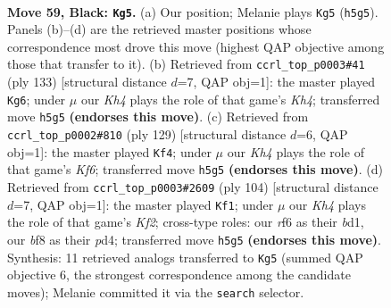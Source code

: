 \documentclass[11pt]{article}
\begin{document}
\clearpage

\begin{figure}[p]\centering
\begin{subfigure}{0.46\textwidth}\centering
\resizebox{\linewidth}{!}{%
\newchessgame
\chessboard[
  setfen={5B2/P7/5R2/1P5k/3K4/8/8/8 b - - 0 59},
  showmover=false,
  pgfstyle=straightmove, color=movearrow, markmove={h5-g5}
]}
\caption{}
\end{subfigure}\hfill
\begin{subfigure}{0.46\textwidth}\centering
\resizebox{\linewidth}{!}{%
\newchessgame
\chessboard[
  setfen={8/8/P7/5n1k/8/1P6/K2B4/3R4 b - - 2 67},
  showmover=false,
  pgfstyle=straightmove, color=movearrow, markmove={h5-g6}
]}
\caption{}
\end{subfigure}
\\[4pt]
\begin{subfigure}{0.46\textwidth}\centering
\resizebox{\linewidth}{!}{%
\newchessgame
\chessboard[
  setfen={8/8/7p/1R3B1P/r7/5k2/3K4/8 b - - 3 65},
  showmover=false,
  pgfstyle=straightmove, color=movearrow, markmove={f3-f4}
]}
\caption{}
\end{subfigure}\hfill
\begin{subfigure}{0.46\textwidth}\centering
\resizebox{\linewidth}{!}{%
\newchessgame
\chessboard[
  setfen={2B5/8/1k1p4/8/3p4/8/5K2/3b4 w - - 12 53},
  showmover=false,
  pgfstyle=straightmove, color=movearrow, markmove={f2-f1}
]}
\caption{}
\end{subfigure}
\caption{\textbf{Move 59, Black: \texttt{Kg5}.} (a) Our position; Melanie plays \texttt{Kg5} (\texttt{h5g5}). Panels (b)--(d) are the retrieved master positions whose correspondence most drove this move (highest QAP objective among those that transfer to it). (b) Retrieved from \texttt{ccrl\_top\_p0003\#41} (ply 133) [structural distance $d$=7, QAP obj=1]: the master played \texttt{Kg6}; under $\mu$ our \emph{Kh4} plays the role of that game's \emph{Kh4}; transferred move \texttt{h5g5} \textbf{(endorses this move)}. (c) Retrieved from \texttt{ccrl\_top\_p0002\#810} (ply 129) [structural distance $d$=6, QAP obj=1]: the master played \texttt{Kf4}; under $\mu$ our \emph{Kh4} plays the role of that game's \emph{Kf6}; transferred move \texttt{h5g5} \textbf{(endorses this move)}. (d) Retrieved from \texttt{ccrl\_top\_p0003\#2609} (ply 104) [structural distance $d$=7, QAP obj=1]: the master played \texttt{Kf1}; under $\mu$ our \emph{Kh4} plays the role of that game's \emph{Kf2}; cross-type roles: our \emph{r}f6 as their \emph{b}d1, our \emph{b}f8 as their \emph{p}d4; transferred move \texttt{h5g5} \textbf{(endorses this move)}. Synthesis: 11 retrieved analogs transferred to \texttt{Kg5} (summed QAP objective 6, the strongest correspondence among the candidate moves); Melanie committed it via the \texttt{search} selector.}
\label{fig:thought-m117}
\end{figure}
\end{document}
